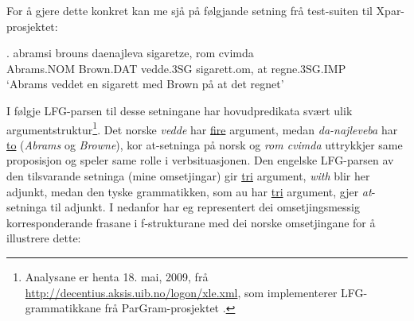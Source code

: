 \documentclass[12pt,a4paper,oneside,draft]{report}
\begin{document}
For å gjere dette konkret kan me sjå på følgjande setning frå
 test-suiten til Xpar-prosjektet:

\exg. abramsi brouns       daenajleva sigaretze, rom cvimda \label{ex:vedde-gloss} \\
      Abrams.NOM Brown.DAT vedde.3SG sigarett.om, at  regne.3SG.IMP \\
     `Abrams veddet en sigarett med Brown på at det regnet' 


I følgje LFG-parsen til desse setningane har hovudpredikata svært ulik
argumentstruktur\footnote{Analysane er henta 18. mai, 2009, frå
        \href{http://decentius.aksis.uib.no/logon/xle.xml}{http://decentius.aksis.uib.no/logon/xle.xml}, som implementerer
        LFG-grammatikkane frå ParGram-prosjektet \citep{butt2002pgp}. }.  Det norske \emph{vedde} har \underline{fire} argument,
medan \emph{da-najleveba} har \underline{to} (\emph{Abrams} og \emph{Browne}), kor
at-setninga på norsk og \emph{rom cvimda} uttrykkjer same proposisjon og
speler same rolle i verbsituasjonen. Den engelske LFG-parsen av den
tilsvarande setninga (mine omsetjingar) gir \underline{tri} argument, \emph{with}
blir her adjunkt, medan den tyske grammatikken, som au har \underline{tri}
argument, gjer \emph{at}-setninga til adjunkt. I \Next nedanfor har eg
representert dei omsetjingsmessig korresponderande frasane i
f\hyp{}strukturane med dei norske omsetjingane for å illustrere dette:
\end{document}
